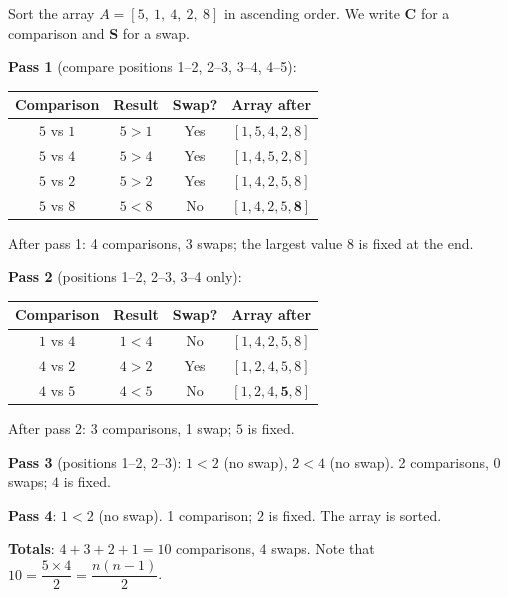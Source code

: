 \documentclass[11pt]{article}
\begin{document}
\begin{exemplebox}
Sort the array $A = [5,\ 1,\ 4,\ 2,\ 8]$ in ascending order. We write \textbf{C} for a comparison and \textbf{S} for a swap.

\textbf{Pass 1} (compare positions 1--2, 2--3, 3--4, 4--5):
\begin{center}
\begin{tabular}{|c|c|c|c|}
\hline
\rowcolor{popblueL} Comparison & Result & Swap? & Array after \\
\hline
$5$ vs $1$ & $5>1$ & Yes & $[1, 5, 4, 2, 8]$ \\
\hline
$5$ vs $4$ & $5>4$ & Yes & $[1, 4, 5, 2, 8]$ \\
\hline
$5$ vs $2$ & $5>2$ & Yes & $[1, 4, 2, 5, 8]$ \\
\hline
$5$ vs $8$ & $5<8$ & No & $[1, 4, 2, 5, \mathbf{8}]$ \\
\hline
\end{tabular}
\end{center}
After pass 1: 4 comparisons, 3 swaps; the largest value $8$ is fixed at the end.

\textbf{Pass 2} (positions 1--2, 2--3, 3--4 only):
\begin{center}
\begin{tabular}{|c|c|c|c|}
\hline
\rowcolor{popblueL} Comparison & Result & Swap? & Array after \\
\hline
$1$ vs $4$ & $1<4$ & No & $[1, 4, 2, 5, 8]$ \\
\hline
$4$ vs $2$ & $4>2$ & Yes & $[1, 2, 4, 5, 8]$ \\
\hline
$4$ vs $5$ & $4<5$ & No & $[1, 2, 4, \mathbf{5}, 8]$ \\
\hline
\end{tabular}
\end{center}
After pass 2: 3 comparisons, 1 swap; $5$ is fixed.

\textbf{Pass 3} (positions 1--2, 2--3): $1<2$ (no swap), $2<4$ (no swap). 2 comparisons, 0 swaps; $4$ is fixed.

\textbf{Pass 4}: $1<2$ (no swap). 1 comparison; $2$ is fixed. The array is sorted.

\textbf{Totals}: $4+3+2+1 = 10$ comparisons, $4$ swaps. Note that $10 = \dfrac{5 \times 4}{2} = \dfrac{n(n-1)}{2}$.
\end{exemplebox}
\end{document}
